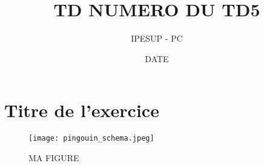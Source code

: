 \documentclass{article}
\title{TD NUMERO DU TD5}
\author{IPESUP - PC }
\date{DATE}
\begin{document}
\maketitle



\section{Titre de l'exercice}

\begin{figure}[h]
  \centering
  \texttt{[image: pingouin\_schema.jpeg]}
  \label{fig:maison}
    \caption{MA FIGURE}
\end{figure}
\end{document}
